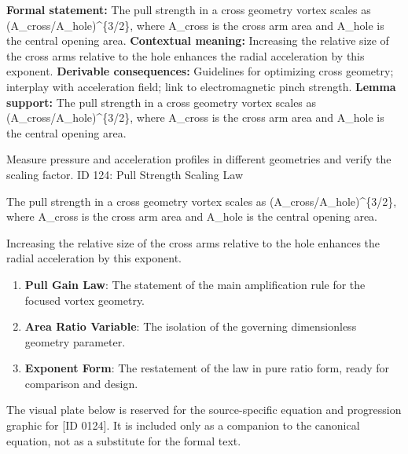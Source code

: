 \begingroup\footnotesize\setlength{\emergencystretch}{3em}\sloppy
\textbf{Formal statement:} The pull strength in a cross geometry vortex scales as (A\_cross/A\_hole)\textasciicircum{}\{3/2\}, where A\_cross is the cross arm area and A\_hole is the central opening area.
\textbf{Contextual meaning:} Increasing the relative size of the cross arms relative to the hole enhances the radial acceleration by this exponent.
\textbf{Derivable consequences:} Guidelines for optimizing cross geometry; interplay with acceleration field; link to electromagnetic pinch strength.
\textbf{Lemma support:} The pull strength in a cross geometry vortex scales as (A\_cross/A\_hole)\textasciicircum{}\{3/2\}, where A\_cross is the cross arm area and A\_hole is the central opening area.\par
\endgroup

Measure pressure and acceleration profiles in different geometries and verify the scaling factor. ID 124: Pull Strength Scaling Law

The pull strength in a cross geometry vortex scales as (A\_cross/A\_hole)\textasciicircum{}\{3/2\}, where A\_cross is the cross arm area and A\_hole is the central opening area.

Increasing the relative size of the cross arms relative to the hole enhances the radial acceleration by this exponent.
\endgroup

\begin{enumerate}[leftmargin=1.6em,itemsep=6pt,topsep=4pt]
\item \textbf{Pull Gain Law}: The statement of the main amplification rule for the focused vortex geometry.
\item \textbf{Area Ratio Variable}: The isolation of the governing dimensionless geometry parameter.
\item \textbf{Exponent Form}: The restatement of the law in pure ratio form, ready for comparison and design.
\end{enumerate}

\begingroup\footnotesize\sloppy
The visual plate below is reserved for the source-specific equation and progression graphic for [ID 0124]. It is included only as a companion to the canonical equation, not as a substitute for the formal text.
\par\endgroup
\ifTZPDarkEdition
{}
\fi


